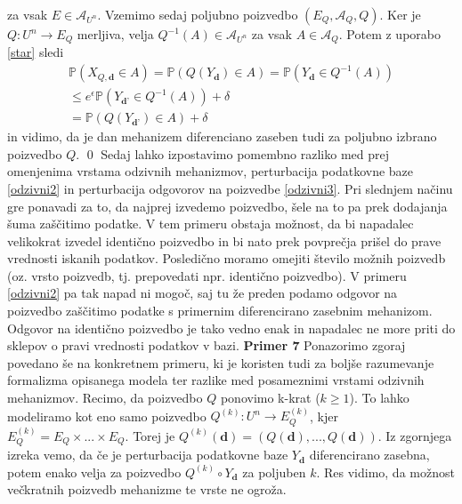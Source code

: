 \documentclass[mat1]{article}
\theoremstyle{definition}
\begin{document}
za vsak $E \in \mathcal{A}_{U^n}$. Vzemimo sedaj poljubno poizvedbo $(E_Q, \mathcal{A}_Q, Q)$. Ker je $Q: U^n \rightarrow E_Q$ merljiva, velja  $Q^{-1}(A)\in \mathcal{A}_{U^n}$ za vsak $A \in \mathcal{A}_Q$. Potem z uporabo \eqref{star} sledi 
\begin{equation*}
\begin{split}
\mathbb{P}(X_{Q, \textbf{d}} \in A) = \mathbb{P}(Q(Y_{ \textbf{d}}) \in A)  = \mathbb{P}(Y_{\textbf{d}} \in Q^{-1}(A)) \\
\leq e^\epsilon \mathbb{P}(Y_{\textbf{d'}} \in Q^{-1}(A)) + \delta \\ 
= \mathbb{P}(Q(Y_\textbf{d'}) \in A) + \delta
\end{split}
\end{equation*}
in vidimo, da je dan mehanizem diferenciano zaseben tudi za poljubno izbrano poizvedbo $Q$.
\newline
\qed
\newline
\newline
Sedaj lahko izpostavimo pomembno razliko med prej omenjenima vrstama odzivnih mehanizmov, perturbacija podatkovne baze \eqref{odzivni2} in perturbacija odgovorov na poizvedbe \eqref{odzivni3}. Pri slednjem načinu gre ponavadi za to, da najprej izvedemo poizvedbo, šele na to pa prek dodajanja šuma zaščitimo podatke. V tem primeru obstaja možnost, da bi napadalec velikokrat izvedel identično poizvedbo in bi nato prek povprečja prišel do prave vrednosti iskanih podatkov. Posledično moramo omejiti število možnih poizvedb (oz. vrsto poizvedb, tj. prepovedati npr. identično poizvedbo). V primeru \eqref{odzivni2} pa tak napad ni mogoč, saj tu že preden podamo odgovor na poizvedbo zaščitimo podatke s primernim diferencirano zasebnim mehanizom. Odgovor na identično poizvedbo je tako vedno enak in napadalec ne more priti do sklepov o pravi vrednosti podatkov v bazi. 
\newline
\newline
\textbf{Primer 7} Ponazorimo zgoraj povedano še na konkretnem primeru, ki je koristen tudi za boljše razumevanje formalizma opisanega modela ter razlike med posameznimi vrstami odzivnih mehanizmov. Recimo, da poizvedbo $Q$ ponovimo k-krat ($ k \geq 1$). To lahko modeliramo kot eno samo poizvedbo $Q^{(k)}: U^n \rightarrow E_{Q}^{(k)}$, kjer $E_{Q}^{(k)} = E_Q \times ... \times E_Q$. Torej je $Q^{(k)}(\textbf{d}) = (Q(\textbf{d}), ... , Q(\textbf{d}))$. Iz zgornjega izreka vemo, da če je perturbacija podatkovne baze $Y_{\textbf{d}}$ diferencirano zasebna, potem enako velja za poizvedbo $Q^{(k)} \circ Y_{\textbf{d}}$ za poljuben $k$. Res vidimo, da možnost večkratnih poizvedb mehanizme te vrste ne ogroža.
\end{document}
